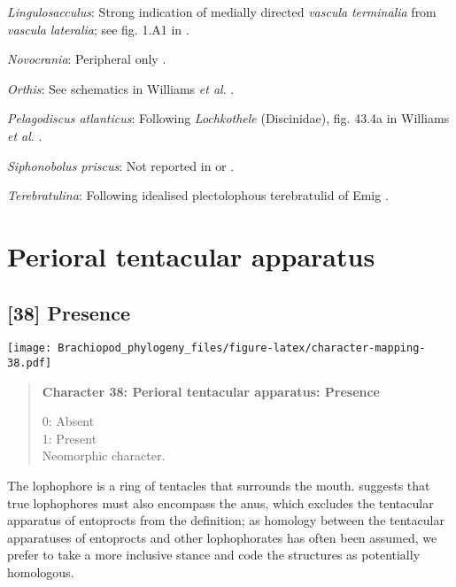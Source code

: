 \documentclass[openany]{book}
\theoremstyle{definition}
\theoremstyle{definition}
\theoremstyle{definition}
\theoremstyle{remark}
\begin{document}
\hypertarget{Lingulosacculus-coding-37}{}
\emph{Lingulosacculus}: Strong indication of medially directed
\emph{vascula} \emph{terminalia} from \emph{vascula} \emph{lateralia};
see fig. 1.A1 in \citet{Balthasar2009EarlyCambrian}.

\hypertarget{Novocrania-coding-37}{}
\emph{Novocrania}: Peripheral only
\citep[p.158]{Williams2000LinguliformeaCraniiformea}.

\hypertarget{Orthis-coding-37}{}
\emph{Orthis}: See schematics in Williams \emph{et al}.
\citeyearpar{Williams2000LinguliformeaCraniiformea}.

\hypertarget{Pelagodiscus_atlanticus-coding-37}{}
\emph{Pelagodiscus atlanticus}: Following \emph{Lochkothele}
(Discinidae), fig. 43.4a in Williams \emph{et al}.
\citeyearpar{Williams2000LinguliformeaCraniiformea}.

\hypertarget{Siphonobolus_priscus-coding-37}{}
\emph{Siphonobolus priscus}: Not reported in
\citet{Havlicek1982LingulaceaPaterinacea} or
\citet{Williams2000LinguliformeaCraniiformea}.

\hypertarget{Terebratulina-coding-37}{}
\emph{Terebratulina}: Following idealised plectolophous terebratulid of
Emig \citeyearpar{Emig1992Functionaldisposition}.

\section{Perioral tentacular
apparatus}\label{perioral-tentacular-apparatus}

\subsection*{{[}38{]} Presence}\label{presence-2}

\texttt{[image: Brachiopod\_phylogeny\_files/figure-latex/character-mapping-38.pdf]}

\begin{quote}
\textbf{Character 38: Perioral tentacular apparatus: Presence}

0: Absent\\
1: Present\\
Neomorphic character.
\end{quote}

The lophophore is a ring of tentacles that surrounds the mouth.
\citet{Temereva2017Innervationof} suggests that true lophophores must
also encompass the anus, which excludes the tentacular apparatus of
entoprocts from the definition; as homology between the tentacular
apparatuses of entoprocts and other lophophorates has often been
assumed, we prefer to take a more inclusive stance and code the
structures as potentially homologous.
\end{document}
